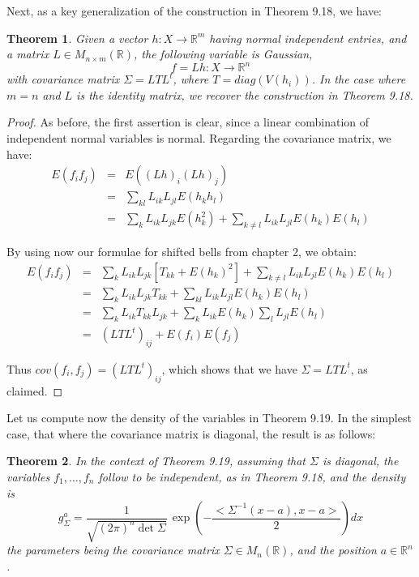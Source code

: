 \documentclass[12pt]{amsbook}
\newtheorem{theorem}{Theorem}[chapter]
\begin{document}
Next, as a key generalization of the construction in Theorem 9.18, we have:

\begin{theorem}
Given a vector $h:X\to\mathbb R^m$ having normal independent entries, and a matrix $L\in M_{n\times m}(\mathbb R)$, the following variable is Gaussian,
$$f=Lh:X\to\mathbb R^n$$
with covariance matrix $\Sigma=LTL^t$, where $T=diag(V(h_i))$. In the case where $m=n$ and $L$ is the identity matrix, we recover the construction in Theorem 9.18. 
\end{theorem}

\begin{proof}
As before, the first assertion is clear, since a linear combination of independent normal variables is normal. Regarding the covariance matrix, we have:
\begin{eqnarray*}
E(f_if_j)
&=&E\left((Lh)_i(Lh)_j\right)\\
&=&\sum_{kl}L_{ik}L_{jl}E(h_kh_l)\\
&=&\sum_kL_{ik}L_{jk}E(h_k^2)+\sum_{k\neq l}L_{ik}L_{jl}E(h_k)E(h_l)
\end{eqnarray*}

By using now our formulae for shifted bells from chapter 2, we obtain:
\begin{eqnarray*}
E(f_if_j)
&=&\sum_kL_{ik}L_{jk}\left[T_{kk}+E(h_k)^2\right]+\sum_{k\neq l}L_{ik}L_{jl}E(h_k)E(h_l)\\
&=&\sum_kL_{ik}L_{jk}T_{kk}+\sum_{kl}L_{ik}L_{jl}E(h_k)E(h_l)\\
&=&\sum_kL_{ik}T_{kk}L_{jk}+\sum_kL_{ik}E(h_k)\sum_lL_{jl}E(h_l)\\
&=&(LTL^t)_{ij}+E(f_i)E(f_j)
\end{eqnarray*}

Thus $cov(f_i,f_j)=(LTL^t)_{ij}$, which shows that we have $\Sigma=LTL^t$, as claimed.
\end{proof}

Let us compute now the density of the variables in Theorem 9.19. In the simplest case, that where the covariance matrix is diagonal, the result is as follows:

\begin{theorem}
In the context of Theorem 9.19, assuming that $\Sigma$ is diagonal, the variables $f_1,\ldots,f_n$ follow to be independent, as in Theorem 9.18, and the density is
$$g_\Sigma^a=\frac{1}{\sqrt{(2\pi)^n\det\Sigma}}\,\exp\left(-\frac{<\Sigma^{-1}(x-a),x-a>}{2}\right)dx$$
the parameters being the covariance matrix $\Sigma\in M_n(\mathbb R)$, and the position $a\in\mathbb R^n$.
\end{theorem}
\end{document}

